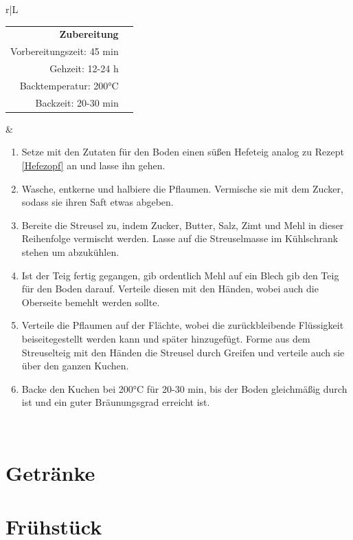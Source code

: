 \documentclass[a4paper, 12pt]{scrbook} 								%
\numberwithin{equation}{section} 									%
\begin{document}
			\newpage
			\begin{tabularx}{\textwidth}{r|L}
			
			\begin{tabular}[t]{rr}
				\textbf{Zubereitung}	\\
				Vorbereitungszeit: 45 min	\\
				Gehzeit: 12-24 h			\\
				Backtemperatur: 200°C		\\
				Backzeit: 20-30 min 
			\end{tabular}			&	\begin{enumerate}[nosep]
											\item Setze mit den Zutaten für den Boden einen süßen Hefeteig analog zu Rezept \ref{Hefezopf} an und lasse ihn gehen.
											\item Wasche, entkerne und halbiere die Pflaumen. Vermische sie mit dem Zucker, sodass sie ihren Saft etwas abgeben.
											\item Bereite die Streusel zu, indem Zucker, Butter, Salz, Zimt und Mehl in dieser Reihenfolge vermischt werden. Lasse auf die Streuselmasse im Kühlschrank stehen um abzukühlen.
											\item Ist der Teig fertig gegangen, gib ordentlich Mehl auf ein Blech gib den Teig für den Boden darauf. Verteile diesen mit den Händen, wobei auch die Oberseite bemehlt werden sollte. 
											\item Verteile die Pflaumen auf der Flächte, wobei die zurückbleibende Flüssigkeit beiseitegestellt werden kann und später hinzugefügt. Forme aus dem Streuselteig mit den Händen die Streusel durch Greifen und verteile auch sie über den ganzen Kuchen.
											\item Backe den Kuchen bei 200°C für 20-30 min, bis der Boden gleichmäßig durch ist und ein guter Bräunungsgrad erreicht ist.
										\end{enumerate}	\\
		\end{tabularx}
		\newpage
		



\chapter{Getränke}


\chapter{Frühstück}

\end{document}
